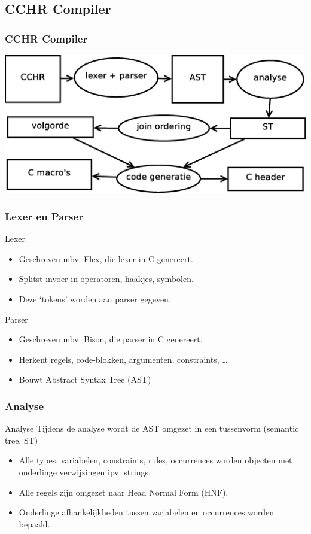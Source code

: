 \documentclass{beamer}
\begin{document}
\subsection{CCHR Compiler}

\begin{frame}
  \frametitle{CCHR Compiler}
  \includegraphics[width=1\textwidth]{fig/compil}
\end{frame}

\begin{frame}
  \frametitle{Lexer en Parser}
  \begin{block}{Lexer}
    \begin{itemize}
      \item Geschreven mbv. Flex, die lexer in C genereert.
      \item Splitst invoer in operatoren, haakjes, symbolen.
      \item Deze `tokens' worden aan parser gegeven.
    \end{itemize}
  \end{block}
  \begin{block}{Parser}
    \begin{itemize}
      \item Geschreven mbv. Bison, die parser in C genereert.
      \item Herkent regels, code-blokken, argumenten, constraints, \ldots
      \item Bouwt Abstract Syntax Tree (AST)
    \end{itemize}
  \end{block}
\end{frame}

\begin{frame}
  \frametitle{Analyse}
  \begin{block}{Analyse}
    Tijdens de analyse wordt de AST omgezet in een tussenvorm (semantic tree, ST)
    \begin{itemize}
      \item Alle types, variabelen, constraints, rules, occurrences worden objecten met
            onderlinge verwijzingen ipv. strings.
      \item Alle regels zijn omgezet naar Head Normal Form (HNF).
      \item Onderlinge afhankelijkheden tussen variabelen en occurrences worden bepaald.
    \end{itemize}
  \end{block}
\end{frame}
\end{document}
